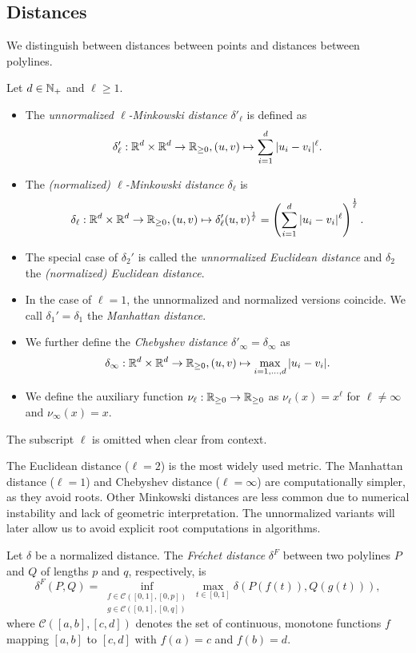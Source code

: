 \subsection{Distances}
\label{ssec:distances}
We distinguish between distances between points and distances between polylines. 

\begin{definition}[Distances]\label{def:point_distance}
  Let \(d \in \mathbb{N}_+\) and \(\ell \geq 1\).
  \begin{itemize}
    \item The \emph{unnormalized \(\ell\)-Minkowski distance} \(\delta'_\ell\) is defined as 
      \[\delta'_\ell:\mathbb{R}^d \times \mathbb{R}^d \to \mathbb{R}_{\geq 0}, (u, v) \mapsto \sum_{i = 1}^d |u_i - v_i|^\ell.\]
    \item The \emph{(normalized) \(\ell\)-Minkowski distance} \(\delta_\ell\) is 
      \[\delta_\ell:\mathbb{R}^d \times \mathbb{R}^d \to \mathbb{R}_{\geq 0}, (u, v) \mapsto \delta'_\ell(u, v)^{\frac1\ell} = \left(\sum_{i = 1}^d |u_i - v_i|^\ell\right)^{\frac1\ell}.\]
    \item The special case of \(\delta_2'\) is called the \emph{unnormalized Euclidean distance} and \(\delta_2\) the \emph{(normalized) Euclidean distance}.
    \item In the case of \(\ell = 1\), the unnormalized and normalized versions coincide. We call \(\delta_1' = \delta_1\) the \emph{Manhattan distance}. 
    \item We further define the \emph{Chebyshev distance} \(\delta'_\infty = \delta_\infty\) as 
      \[\delta_\infty:\mathbb{R}^d \times \mathbb{R}^d \to \mathbb{R}_{\geq 0}, (u, v) \mapsto \max_{i = 1, \dots, d} |u_i - v_i|.\]
    \item We define the auxiliary function \(\nu_\ell:\mathbb{R}_{\geq 0} \to \mathbb{R}_{\geq 0}\) as \(\nu_\ell(x) = x^\ell\) for \(\ell \neq \infty\) and \(\nu_\infty(x) = x\).
  \end{itemize}

  The subscript \(\ell\) is omitted when clear from context.
\end{definition}

The Euclidean distance (\(\ell = 2\)) is the most widely used metric. The Manhattan distance (\(\ell = 1\)) and Chebyshev distance (\(\ell = \infty\)) are computationally simpler, as they avoid roots. 
Other Minkowski distances are less common due to numerical instability and lack of geometric interpretation. The unnormalized variants will later allow us to avoid explicit root computations in algorithms. 

\begin{definition}\label{def:frechet}
  Let \(\delta\) be a normalized distance. The \emph{Fréchet distance} \(\delta^F\) between two polylines \(P\) and \(Q\) of lengths \(p\) and \(q\), respectively, is 
	\[\delta^F(P, Q) = \inf_{\substack{f \in \mathcal{C}([0,1], [0, p]) \\ g \in \mathcal{C}([0,1], [0, q])}} \max_{t \in [0,1]}\delta(P(f(t)), Q(g(t))),\]
	where \(\mathcal{C}([a,b], [c,d])\) denotes the set of continuous, monotone functions \(f\) mapping \([a,b]\) to \([c,d]\) with \(f(a) = c\) and \(f(b) = d\).
\end{definition}

